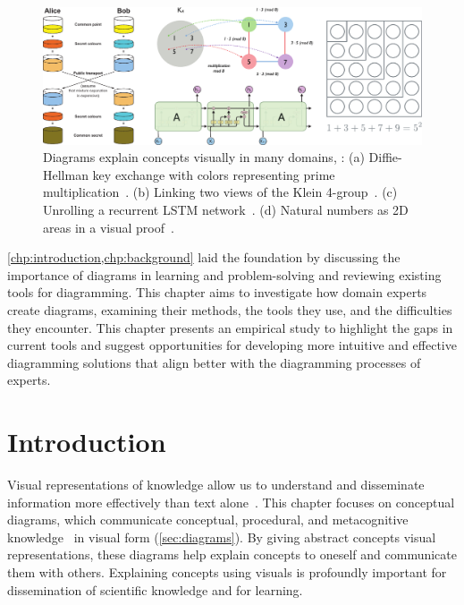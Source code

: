 \begin{figure}[h]
  \centering
  \includegraphics[width=\textwidth]{assets/interviews/teaser-a.pdf}
  \caption{
      Diagrams explain concepts visually in many domains, \eg{}: (a) Diffie-Hellman key exchange with colors representing prime multiplication~\cite{wiki:crypto}. (b) Linking two views of the Klein 4-group~\cite{OBT}. (c) Unrolling a recurrent LSTM network~\cite{UnderstandLSTM}. (d) Natural numbers as 2D areas in a visual proof~\cite{SystemsOfThought}.
  }
  \label{fig:interviews-teaser}
\end{figure}

\cref{chp:introduction,chp:background} laid the foundation by discussing the importance of diagrams in learning and problem-solving and reviewing existing tools for diagramming. This chapter aims to investigate how domain experts create diagrams, examining their methods, the tools they use, and the difficulties they encounter. This chapter presents an empirical study to highlight the gaps in current tools and suggest opportunities for developing more intuitive and effective diagramming solutions that align better with the diagramming processes of experts. 


\section{Introduction}

Visual representations of knowledge allow us to understand and disseminate information more effectively than text alone~\cite{promiseOfMultimediaLearning}. This chapter focuses on conceptual diagrams, which communicate conceptual, procedural, and metacognitive knowledge~\cite{bloomRevised} in visual form (\cref{sec:diagrams}). By giving abstract concepts visual representations, these diagrams help explain concepts to oneself and communicate them with others. Explaining concepts using visuals is profoundly important for dissemination of scientific knowledge and for learning. 

